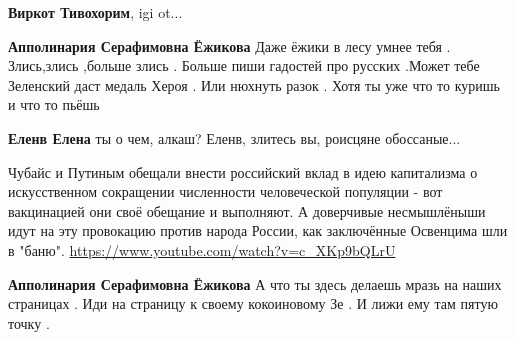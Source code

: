 \begin{itemize}
\begin{itemize}
\textbf{Виркот Тивохорим}, igi ot...

 
\textbf{Апполинария Серафимовна Ёжикова} Даже ёжики в лесу умнее тебя . Злись,злись ,больше злись . Больше пиши гадостей про русских .Может тебе Зеленский даст медаль Хероя . Или нюхнуть разок . Хотя ты уже что то куришь и что то пьёшь

 
\textbf{Еленв Елена} ты о чем, алкаш? Еленв, злитесь вы, роисцяне обоссаные... \Smiley[1.0][yellow]

 
Чубайс и Путиным обещали внести российский вклад в идею капитализма о искусственном сокращении численности человеческой популяции - вот вакцинацией они своё обещание и выполняют.
А доверчивые несмышлёныши идут на эту провокацию против народа России, как заключённые Освенцима шли в "баню".
\url{https://www.youtube.com/watch?v=c_XKp9bQLrU}

 
\textbf{Апполинария Серафимовна Ёжикова} А что ты здесь делаешь мразь на наших
страницах . Иди на страницу к своему кокоиновому Зе . И лижи ему там пятую
точку .

\end{itemize}

 


\end{itemize}

